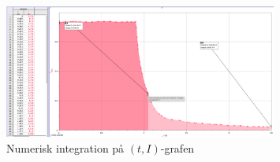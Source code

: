 \documentclass{report}
\begin{document}
\begin{figure}[H]
\begin{center}
  \includegraphics[width=0.8\textwidth]{batteri.png}
\end{center}
  \caption{Numerisk integration på $(t,I)$-grafen}
\label{fig:batteri}
\end{figure}
\end{document}
